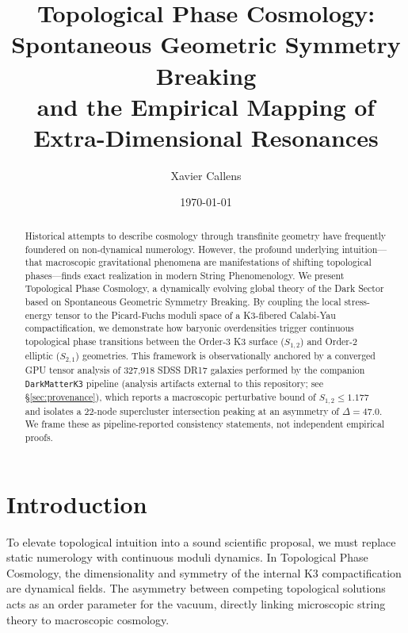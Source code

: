\documentclass[aps,prd,twocolumn,nofootinbib,superscriptaddress,10pt]{revtex4-2}
\begin{document}
\title{Topological Phase Cosmology: Spontaneous Geometric Symmetry Breaking \\ and the Empirical Mapping of Extra-Dimensional Resonances}

\author{Xavier Callens}

\date{\today}

\begin{abstract}
Historical attempts to describe cosmology through transfinite geometry have frequently foundered on non-dynamical numerology. However, the profound underlying intuition---that macroscopic gravitational phenomena are manifestations of shifting topological phases---finds exact realization in modern String Phenomenology. We present Topological Phase Cosmology, a dynamically evolving global theory of the Dark Sector based on Spontaneous Geometric Symmetry Breaking. By coupling the local stress-energy tensor to the Picard-Fuchs moduli space of a K3-fibered Calabi-Yau compactification, we demonstrate how baryonic overdensities trigger continuous topological phase transitions between the Order-3 K3 surface ($S_{1,2}$) and Order-2 elliptic ($S_{2,1}$) geometries. This framework is observationally anchored by a converged GPU tensor analysis of 327,918 SDSS DR17 galaxies performed by the companion \texttt{DarkMatterK3} pipeline (analysis artifacts external to this repository; see \S\ref{sec:provenance}), which reports a macroscopic perturbative bound of $S_{1,2} \le 1.177$ and isolates a 22-node supercluster intersection peaking at an asymmetry of $\Delta = 47.0$. We frame these as pipeline-reported consistency statements, not independent empirical proofs.
\end{abstract}

\maketitle

\section{Introduction}
To elevate topological intuition into a sound scientific proposal, we must replace static numerology with continuous moduli dynamics. In Topological Phase Cosmology, the dimensionality and symmetry of the internal K3 compactification are dynamical fields. The asymmetry between competing topological solutions acts as an order parameter for the vacuum, directly linking microscopic string theory to macroscopic cosmology.
\end{document}
